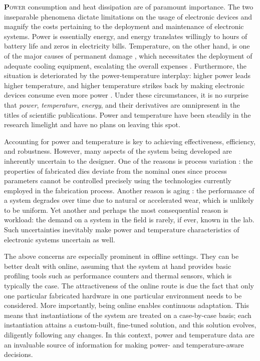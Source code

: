 \lettrine[findent=0.4em, nindent=0em]{\textbf{P}}{ower} consumption and heat
dissipation are of paramount importance. The two inseparable phenomena dictate
limitations on the usage of electronic devices and magnify the costs pertaining
to the deployment and maintenance of electronic systems. Power is essentially
energy, and energy translates willingly to hours of battery life and zeros in
electricity bills. Temperature, on the other hand, is one of the major causes of
permanent damage \cite{jedec}, which necessitates the deployment of adequate
cooling equipment, escalating the overall expenses \cite{chaudhry2015}.
Furthermore, the situation is deteriorated by the power-temperature interplay:
higher power leads higher temperature, and higher temperature strikes back by
making electronic devices consume even more power \cite{liu2007}. Under these
circumstances, it is no surprise that \emph{power}, \emph{temperature},
\emph{energy}, and their derivatives are omnipresent in the titles of scientific
publications. Power and temperature have been steadily in the research limelight
and have no plans on leaving this spot.

Accounting for power and temperature is key to achieving effectiveness,
efficiency, and robustness. However, many aspects of the system being developed
are inherently uncertain to the designer. One of the reasons is process
variation \cite{chandrakasan2000}: the properties of fabricated dies deviate
from the nominal ones since process parameters cannot be controlled precisely
using the technologies currently employed in the fabrication process. Another
reason is aging \cite{coskun2006}: the performance of a system degrades over
time due to natural or accelerated wear, which is unlikely to be uniform. Yet
another and perhaps the most consequential reason is workload: the demand on a
system in the field is rarely, if ever, known in the lab. Such uncertainties
inevitably make power and temperature characteristics of electronic systems
uncertain as well.

The above concerns are especially prominent in offline settings. They can be
better dealt with online, assuming that the system at hand provides basic
profiling tools such as performance counters and thermal sensors, which is
typically the case. The attractiveness of the online route is due the fact that
only one particular fabricated hardware in one particular environment needs to
be considered. More importantly, being online enables continuous adaptation.
This means that instantiations of the system are treated on a case-by-case
basis; each instantiation attains a custom-built, fine-tuned solution, and this
solution evolves, diligently following any changes. In this context, power and
temperature data are an invaluable source of information for making power- and
temperature-aware decisions.

